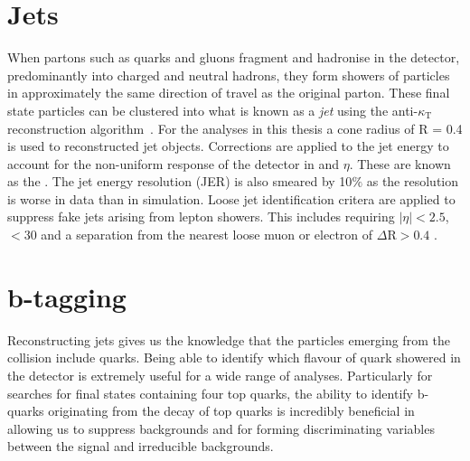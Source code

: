 \section{Jets}
When partons such as quarks and gluons fragment and hadronise in the detector, predominantly into charged and neutral hadrons, they form showers of particles in approximately the same direction of travel as the original parton. These final state particles can be clustered into what is known as a \emph{jet} using the anti-$\kappa_{\textrm{T}}$ reconstruction algorithm~\cite{Cacciari:2008gp}. For the analyses in this thesis a cone radius of R = 0.4 is used to reconstructed jet objects. Corrections are applied to the jet energy to account for the non-uniform response of the detector in \pt and $\eta$. These are known as the . The jet energy resolution (JER) is also smeared by 10$\%$ as the resolution is worse in data than in simulation. Loose jet identification critera are applied to suppress fake jets arising from lepton showers. This includes requiring $|\eta|<2.5$, \pt$<30$ and a separation from the nearest loose muon or electron of $\Delta\textrm{R}>0.4$ .

\section{b-tagging}
Reconstructing jets gives us the knowledge that the particles emerging from the collision include quarks. Being able to identify which flavour of quark showered in the detector is extremely useful for a wide range of analyses. Particularly for searches for final states containing four top quarks, the ability to identify b-quarks originating from the decay of top quarks is incredibly beneficial in allowing us to suppress backgrounds and for forming discriminating variables between the signal and irreducible backgrounds. 

